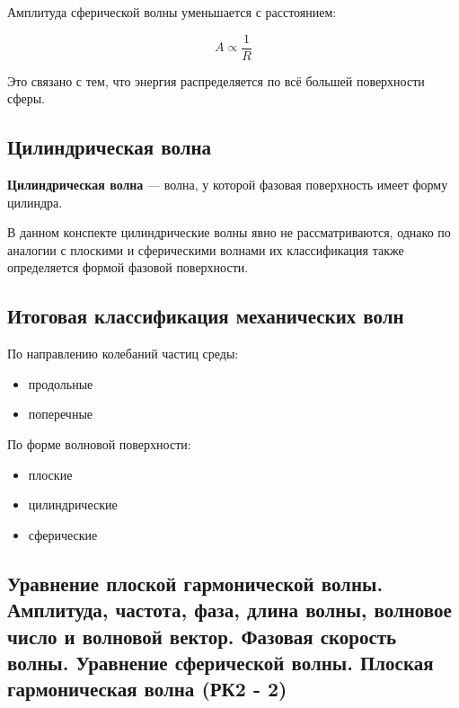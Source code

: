 \documentclass[a4paper,12pt]{article}
\begin{document}
Амплитуда сферической волны уменьшается с расстоянием:

\[
A \propto \frac{1}{R}
\]

Это связано с тем, что энергия распределяется по всё большей поверхности сферы.

\subsection*{Цилиндрическая волна}

\begin{definitionbox}
\textbf{Цилиндрическая волна} — волна, у которой фазовая поверхность имеет форму цилиндра.
\end{definitionbox}

В данном конспекте цилиндрические волны явно не рассматриваются, однако по аналогии с плоскими и сферическими волнами их классификация также определяется формой фазовой поверхности.


\subsection*{Итоговая классификация механических волн}

По направлению колебаний частиц среды:

\begin{itemize}
\item продольные
\item поперечные
\end{itemize}

По форме волновой поверхности:

\begin{itemize}
\item плоские
\item цилиндрические
\item сферические
\end{itemize}

\subsection{Уравнение плоской гармонической волны. Амплитуда, частота, фаза, длина волны, волновое число и волновой вектор. Фазовая скорость волны. Уравнение сферической волны. Плоская гармоническая волна (РК2 - 2)}
\end{document}
